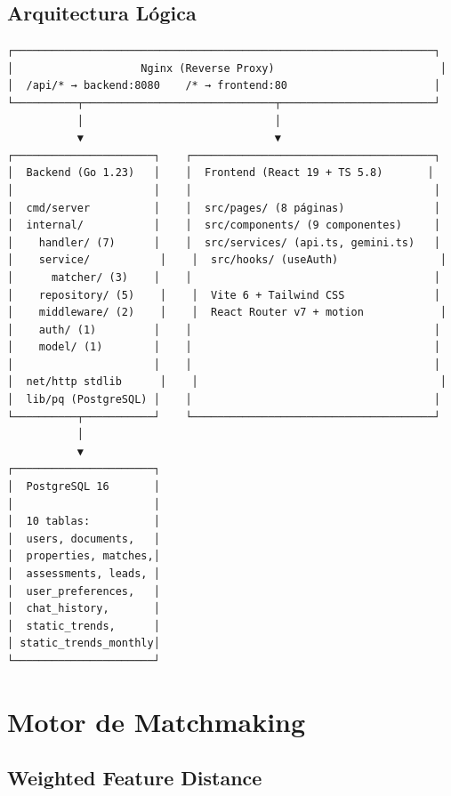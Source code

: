 \documentclass[11pt,a4paper]{article}
\begin{document}
\subsection{Arquitectura Lógica}

\begin{verbatim}
┌──────────────────────────────────────────────────────────────────┐
│                    Nginx (Reverse Proxy)                          │
│  /api/* → backend:8080    /* → frontend:80                       │
└──────────┬──────────────────────────────┬────────────────────────┘
           │                              │
           ▼                              ▼
┌──────────────────────┐    ┌──────────────────────────────────────┐
│  Backend (Go 1.23)   │    │  Frontend (React 19 + TS 5.8)       │
│                      │    │                                      │
│  cmd/server          │    │  src/pages/ (8 páginas)              │
│  internal/           │    │  src/components/ (9 componentes)     │
│    handler/ (7)      │    │  src/services/ (api.ts, gemini.ts)   │
│    service/           │    │  src/hooks/ (useAuth)                │
│      matcher/ (3)    │    │                                      │
│    repository/ (5)    │    │  Vite 6 + Tailwind CSS              │
│    middleware/ (2)    │    │  React Router v7 + motion            │
│    auth/ (1)         │    │                                      │
│    model/ (1)        │    │                                      │
│                      │    │                                      │
│  net/http stdlib      │    │                                      │
│  lib/pq (PostgreSQL) │    │                                      │
└──────────┬───────────┘    └──────────────────────────────────────┘
           │
           ▼
┌──────────────────────┐
│  PostgreSQL 16       │
│                      │
│  10 tablas:          │
│  users, documents,   │
│  properties, matches,│
│  assessments, leads, │
│  user_preferences,   │
│  chat_history,       │
│  static_trends,      │
│ static_trends_monthly│
└──────────────────────┘
\end{verbatim}

\section{Motor de Matchmaking}

\subsection{Weighted Feature Distance}
\end{document}
